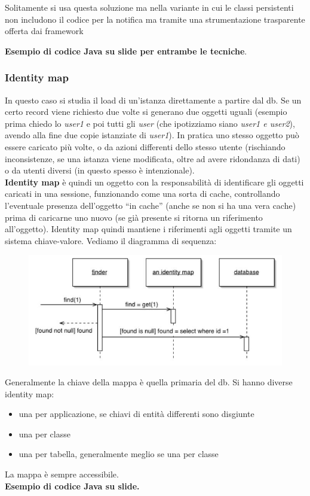 \documentclass[a4paper,12pt, oneside]{book}
\begin{document}
\begin{itemize}
\begin{figure}[H]
  \end{figure}
  Solitamente si usa questa soluzione ma nella variante in cui le classi
  persistenti non includono il codice per la notifica ma tramite una
  strumentazione trasparente offerta dai framework
\end{itemize}
\textbf{Esempio di codice Java su slide per entrambe le tecniche}.
\subsubsection{Identity map}
In questo caso si studia il load di un'istanza direttamente a partire dal
db. Se un certo record viene richiesto due volte si generano due oggetti uguali
(esempio prima chiedo lo \textit{user1} e poi tutti gli \textit{user} (che
ipotizziamo siano \textit{user1 \textnormal{e} user2}), avendo
alla fine due copie istanziate di \textit{user1}). In pratica uno stesso oggetto
può essere caricato più volte, o da azioni differenti dello stesso utente
(rischiando inconsistenze, se una istanza viene modificata, oltre ad avere
ridondanza di dati) o da utenti diversi (in questo spesso è intenzionale).\\
\textbf{Identity map} è quindi un oggetto con la responsabilità di identificare
gli oggetti caricati in una sessione, funzionando come una sorta di cache,
controllando l'eventuale presenza dell'oggetto ``in cache'' (anche se non si ha
una vera cache) prima di caricarne uno nuovo (se già presente si ritorna un
riferimento all'oggetto). Identity map quindi mantiene i riferimenti agli
oggetti tramite un sistema chiave-valore. Vediamo il diagramma di sequenza:
\begin{figure}[H]
  \centering
  \includegraphics[scale = 0.4]{img/im.jpg}
\end{figure}
Generalmente la chiave della mappa è quella primaria del db. Si hanno diverse
identity map:
\begin{itemize}
  \item una per applicazione, se chiavi di entità differenti sono disgiunte
  \item una per classe
  \item una per tabella, generalmente meglio se una per classe
\end{itemize}
La mappa è sempre accessibile.\\
\textbf{Esempio di codice Java su slide.}
\end{document}
